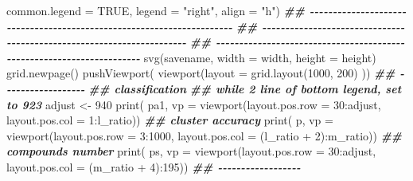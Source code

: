 \documentclass[
]{article}
\newenvironment{Shaded}{\begin{snugshade}}{\end{snugshade}}
\newcommand{\AttributeTok}[1]{\textcolor[rgb]{0.77,0.63,0.00}{#1}}
\newcommand{\ConstantTok}[1]{\textcolor[rgb]{0.00,0.00,0.00}{#1}}
\newcommand{\DecValTok}[1]{\textcolor[rgb]{0.00,0.00,0.81}{#1}}
\newcommand{\DocumentationTok}[1]{\textcolor[rgb]{0.56,0.35,0.01}{\textbf{\textit{#1}}}}
\newcommand{\FunctionTok}[1]{\textcolor[rgb]{0.00,0.00,0.00}{#1}}
\newcommand{\NormalTok}[1]{#1}
\newcommand{\OtherTok}[1]{\textcolor[rgb]{0.56,0.35,0.01}{#1}}
\newcommand{\SpecialCharTok}[1]{\textcolor[rgb]{0.00,0.00,0.00}{#1}}
\newcommand{\StringTok}[1]{\textcolor[rgb]{0.31,0.60,0.02}{#1}}
\begin{document}
\begin{Shaded}
\begin{Highlighting}[]
                            \AttributeTok{common.legend =} \ConstantTok{TRUE}\NormalTok{, }\AttributeTok{legend =} \StringTok{"right"}\NormalTok{, }\AttributeTok{align =} \StringTok{"h"}\NormalTok{)}
    \DocumentationTok{\#\# {-}{-}{-}{-}{-}{-}{-}{-}{-}{-}{-}{-}{-}{-}{-}{-}{-}{-}{-}{-}{-}{-}{-}{-}{-}{-}{-}{-}{-}{-}{-}{-}{-}{-}{-}{-}{-}{-}{-}{-}{-}{-}{-}{-}{-}{-}{-}{-}{-}{-}{-}{-}{-}{-}{-}{-}{-}{-}{-}{-}{-}{-}{-}{-}{-}{-}{-}{-}{-}{-} }
    \DocumentationTok{\#\# {-}{-}{-}{-}{-}{-}{-}{-}{-}{-}{-}{-}{-}{-}{-}{-}{-}{-}{-}{-}{-}{-}{-}{-}{-}{-}{-}{-}{-}{-}{-}{-}{-}{-}{-}{-}{-}{-}{-}{-}{-}{-}{-}{-}{-}{-}{-}{-}{-}{-}{-}{-}{-}{-}{-}{-}{-}{-}{-}{-}{-}{-}{-}{-}{-}{-}{-}{-}{-}{-} }
    \DocumentationTok{\#\# {-}{-}{-}{-}{-}{-}{-}{-}{-}{-}{-}{-}{-}{-}{-}{-}{-}{-}{-}{-}{-}{-}{-}{-}{-}{-}{-}{-}{-}{-}{-}{-}{-}{-}{-}{-}{-}{-}{-}{-}{-}{-}{-}{-}{-}{-}{-}{-}{-}{-}{-}{-}{-}{-}{-}{-}{-}{-}{-}{-}{-}{-}{-}{-}{-}{-}{-}{-}{-}{-} }
    \FunctionTok{svg}\NormalTok{(savename, }\AttributeTok{width =}\NormalTok{ width, }\AttributeTok{height =}\NormalTok{ height)}
    \FunctionTok{grid.newpage}\NormalTok{()}
    \FunctionTok{pushViewport}\NormalTok{( }\FunctionTok{viewport}\NormalTok{(}\AttributeTok{layout =} \FunctionTok{grid.layout}\NormalTok{(}\DecValTok{1000}\NormalTok{, }\DecValTok{200}\NormalTok{) ))}
    \DocumentationTok{\#\# {-}{-}{-}{-}{-}{-}{-}{-}{-}{-}{-}{-}{-}{-}{-}{-}{-}{-} }
    \DocumentationTok{\#\# classification}
    \DocumentationTok{\#\# while 2 line of bottom legend, set to 923}
\NormalTok{    adjust }\OtherTok{\textless{}{-}} \DecValTok{940}
    \FunctionTok{print}\NormalTok{( pa1, }\AttributeTok{vp =} \FunctionTok{viewport}\NormalTok{(}\AttributeTok{layout.pos.row =} \DecValTok{30}\SpecialCharTok{:}\NormalTok{adjust, }\AttributeTok{layout.pos.col =} \DecValTok{1}\SpecialCharTok{:}\NormalTok{l\_ratio))}
    \DocumentationTok{\#\# cluster accuracy}
    \FunctionTok{print}\NormalTok{( p, }\AttributeTok{vp =} \FunctionTok{viewport}\NormalTok{(}\AttributeTok{layout.pos.row =} \DecValTok{3}\SpecialCharTok{:}\DecValTok{1000}\NormalTok{, }\AttributeTok{layout.pos.col =}\NormalTok{ (l\_ratio }\SpecialCharTok{+} \DecValTok{2}\NormalTok{)}\SpecialCharTok{:}\NormalTok{m\_ratio))}
    \DocumentationTok{\#\# compounds number}
    \FunctionTok{print}\NormalTok{( ps, }\AttributeTok{vp =} \FunctionTok{viewport}\NormalTok{(}\AttributeTok{layout.pos.row =} \DecValTok{30}\SpecialCharTok{:}\NormalTok{adjust, }\AttributeTok{layout.pos.col =}\NormalTok{ (m\_ratio }\SpecialCharTok{+} \DecValTok{4}\NormalTok{)}\SpecialCharTok{:}\DecValTok{195}\NormalTok{))}
    \DocumentationTok{\#\# {-}{-}{-}{-}{-}{-}{-}{-}{-}{-}{-}{-}{-}{-}{-}{-}{-}{-} }

\end{Highlighting}
\end{Shaded}
\end{document}
